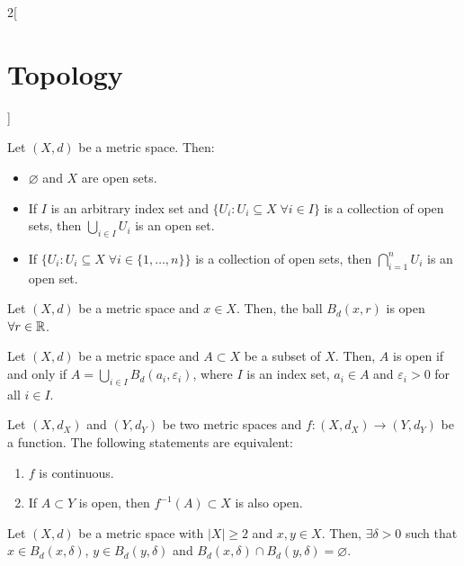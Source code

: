 \documentclass[../../../main.tex]{subfiles}
\begin{document}
\begin{multicols}{2}[\section{Topology}]
\begin{definition}
  \end{definition}
  \begin{prop}
    Let $(X,d)$ be a metric space. Then:
    \begin{itemize}
      \item $\varnothing$ and $X$ are open sets.
      \item If $I$ is an arbitrary index set and $\{U_i:U_i\subseteq X\;\forall i\in I\}$ is a collection of open sets, then $\bigcup_{i\in I}U_i$ is an open set.
      \item If $\{U_i:U_i\subseteq X\;\forall i\in \{1,\ldots,n\}\}$ is a collection of open sets, then $\bigcap_{i=1}^nU_i$ is an open set.
    \end{itemize}
  \end{prop}
  \begin{prop}
    Let $(X,d)$ be a metric space and $x\in X$. Then, the ball $B_d(x,r)$ is open $\forall r\in\mathbb{R}$.
  \end{prop}
  \begin{prop}
    Let $(X,d)$ be a metric space and $A\subset X$ be a subset of $X$. Then, $A$ is open if and only if $A=\bigcup_{i\in I}B_d(a_i,\varepsilon_i)$, where $I$ is an index set, $a_i\in A$ and $\varepsilon_i>0$ for all $i\in I$.
  \end{prop}
  \begin{theorem}
    Let $(X,d_X)$ and $(Y,d_Y)$ be two metric spaces and $f:(X,d_X)\rightarrow(Y,d_Y)$ be a function. The following statements are equivalent:
    \begin{enumerate}
      \item $f$ is continuous.
      \item If $A\subset Y$ is open, then $f^{-1}(A)\subset X$ is also open.
    \end{enumerate}
  \end{theorem}
  \begin{prop}
    Let $(X,d)$ be a metric space with $|X|\geq 2$ and $x,y\in X$. Then, $\exists\delta>0$ such that $x\in B_d(x,\delta)$, $y\in B_d(y,\delta)$ and $B_d(x,\delta)\cap B_d(y,\delta)=\varnothing$.
  \end{prop}

\end{multicols}
\end{document}
